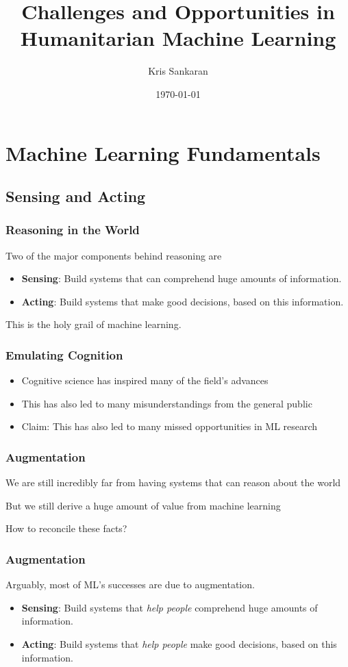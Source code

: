 \documentclass[10pt,mathserif]{beamer}
\title{\large \bfseries Challenges and Opportunities in \\
  Humanitarian Machine Learning}
\author{Kris Sankaran}
\date{\today}
\begin{document}
\maketitle

\section{Machine Learning Fundamentals}
\label{sec:label}

\subsection{Sensing and Acting}
\label{subsec:label}

\begin{frame}[]
  \frametitle{Reasoning in the World}
  Two of the major components behind reasoning are
  \begin{itemize}
    \item \textbf{Sensing}: Build systems that can comprehend huge amounts of
      information.
    \item \textbf{Acting}: Build systems that make good decisions, based on this
      information.
  \end{itemize}
  This is the holy grail of machine learning.
\end{frame}

\begin{frame}
  \frametitle{Emulating Cognition}
  \begin{itemize}
  \item Cognitive science has inspired many of the field's advances
  \item This has also led to many misunderstandings from the general public
  \item Claim: This has also led to many missed opportunities in ML research
  \end{itemize}
\end{frame}

\begin{frame}
  \frametitle{Augmentation}
  \item We are still incredibly far from having systems that can reason about the world
  \item But we still derive a huge amount of value from machine learning
  \item How to reconcile these facts?
\end{frame}

\begin{frame}
  \frametitle{Augmentation}
  Arguably, most of ML's successes are due to augmentation.
  \begin{itemize}
    \item \textbf{Sensing}: Build systems that \textit{help people} comprehend
      huge amounts of information.
    \item \textbf{Acting}: Build systems that \textit{help people} make good
      decisions, based on this information.
  \end{itemize}
\end{frame}
\end{document}
